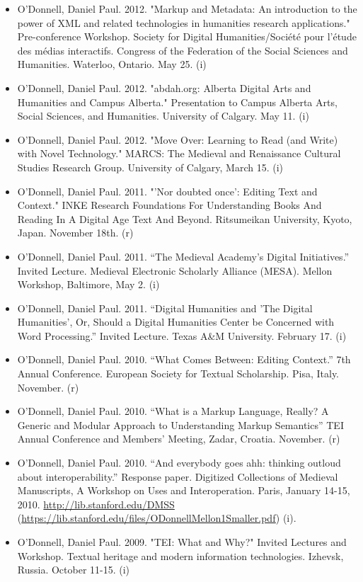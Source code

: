 \documentclass[12pt]{article}
\begin{document}
\begin{itemize}
  \item O'Donnell, Daniel Paul. 2012. "Markup and Metadata: An introduction to the power of XML and related technologies in humanities research applications." Pre-conference Workshop. Society for Digital Humanities/Société pour l’étude des médias interactifs. Congress of the Federation of the Social Sciences and Humanities. Waterloo, Ontario. May 25. (i)
  \item O'Donnell, Daniel Paul. 2012. "abdah.org: Alberta Digital Arts and Humanities and Campus Alberta." Presentation to Campus Alberta Arts, Social Sciences, and Humanities. University of Calgary. May 11. (i)
  \item O'Donnell, Daniel Paul. 2012. "Move Over: Learning to Read (and Write) with Novel Technology." MARCS: The Medieval and Renaissance Cultural Studies Research Group. University of  Calgary, March 15. (i)
  \item O'Donnell, Daniel Paul. 2011. "'Nor doubted once': Editing Text and Context." INKE Research Foundations For Understanding Books And Reading In A Digital Age Text And Beyond. Ritsumeikan University, Kyoto, Japan. November 18th. (r)
  \item O'Donnell, Daniel Paul. 2011. “The Medieval Academy's Digital Initiatives.” Invited Lecture. Medieval Electronic Scholarly Alliance (MESA). Mellon Workshop, Baltimore, May 2. (i)
  \item O'Donnell, Daniel Paul. 2011. “Digital Humanities and 'The Digital Humanities', Or, Should a Digital Humanities Center be Concerned with Word Processing.” Invited Lecture. Texas A\&M University. February 17. (i)
  \item O'Donnell, Daniel Paul. 2010. “What Comes Between: Editing Context.” 7th Annual Conference. European Society for Textual Scholarship. Pisa, Italy. November. (r)
  \item O'Donnell, Daniel Paul. 2010. “What is a Markup Language, Really? A Generic and Modular Approach to Understanding Markup Semantics” TEI Annual Conference and Members' Meeting, Zadar, Croatia. November. (r)
  \item O'Donnell, Daniel Paul. 2010. “And everybody goes ahh: thinking outloud about interoperability.” Response paper. Digitized Collections of Medieval Manuscripts, A Workshop on Uses and Interoperation. Paris, January 14-15, 2010. \url{http://lib.stanford.edu/DMSS} (\url{https://lib.stanford.edu/files/ODonnellMellon1Smaller.pdf}) (i).
  \item O'Donnell, Daniel Paul. 2009. "TEI: What and Why?" Invited Lectures and Workshop. Textual heritage and modern information technologies. Izhevsk, Russia. October 11-15. (i)

\end{itemize}
\end{document}
